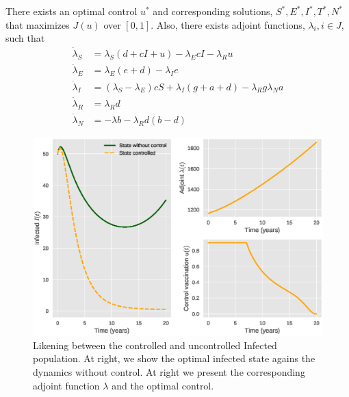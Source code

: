 \begin{theorem} 
    There exists an optimal control $u^{*}$ and corresponding solutions, \break
    $S^{*}, E^{*}, I^{*}, T^{*}, N^{*}$ that maximizes $J(u)$ over $[0, 1]$. 
    Also, there exists adjoint functions, $\lambda_{i}, i \in J$, such that
    \begin{align*}
         \dot{\lambda}_{S} &=
            \lambda_{S}\left(d + cI + u \right) - \lambda_{E}cI - 
            \lambda_{R}u   \\
        \dot{\lambda}_{E} &=
            \lambda_{E}(e + d) - \lambda_{I}e  \\
        \dot{\lambda}_{I} &=
            (\lambda_{S} - \lambda_{E})cS + \lambda_{I}(g + a +d) - \lambda_{R}g
            \lambda_{N}a\\
        \dot{\lambda}_{R} &=    \lambda_{R}d  \\
        \dot{\lambda}_{N} &=
            - \lambda b - \lambda_{R}d  (b - d)
    \end{align*}
\end{theorem}

\begin{figure}[tbh!]
\centering
	\includegraphics[width=0.7\linewidth]{./Figures/epidemics_lenhart_lab7}
	\caption{Likening between the controlled and uncontrolled Infected 
	 population.  At right, we show the optimal infected state agains the 
	 dynamics without 
	 control. At right we present the corresponding adjoint function $\lambda$ 
	 and the optimal control.}
\label{fig:epidemicslenhartlab7}
\end{figure}
